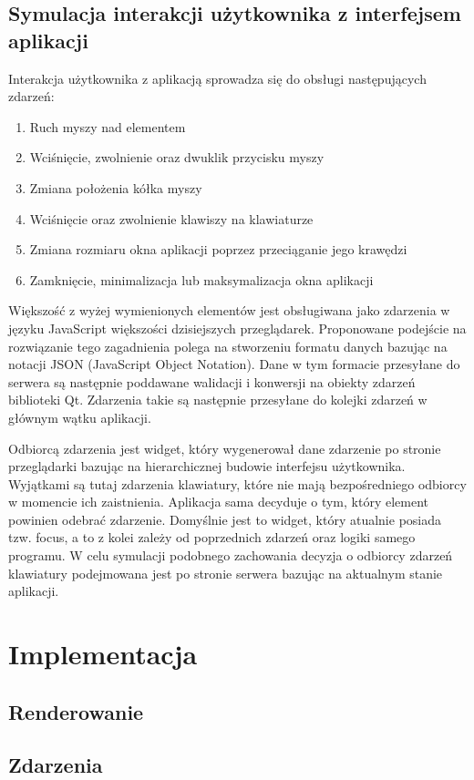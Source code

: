 \documentclass[polish]{inz}
\begin{document}
\section{Symulacja interakcji użytkownika z interfejsem aplikacji}
Interakcja użytkownika z aplikacją sprowadza się do obsługi następujących zdarzeń:
\begin{enumerate}
  \item Ruch myszy nad elementem
  \item Wciśnięcie, zwolnienie oraz dwuklik przycisku myszy
  \item Zmiana położenia kółka myszy
  \item Wciśnięcie oraz zwolnienie klawiszy na klawiaturze
  \item Zmiana rozmiaru okna aplikacji poprzez przeciąganie jego krawędzi
  \item Zamknięcie, minimalizacja lub maksymalizacja okna aplikacji
\end{enumerate}
Większość z wyżej wymienionych elementów jest obsługiwana jako zdarzenia w języku JavaScript większości dzisiejszych przeglądarek. Proponowane podejście na rozwiązanie tego zagadnienia polega na stworzeniu formatu danych bazując na notacji JSON (JavaScript Object Notation). Dane w tym formacie przesyłane do serwera są następnie poddawane walidacji i konwersji na obiekty zdarzeń biblioteki Qt. Zdarzenia takie są następnie przesyłane do kolejki zdarzeń w głównym wątku aplikacji. 

Odbiorcą zdarzenia jest widget, który wygenerował dane zdarzenie po stronie przeglądarki bazując na hierarchicznej budowie interfejsu użytkownika. Wyjątkami są tutaj zdarzenia klawiatury, które nie mają bezpośredniego odbiorcy w momencie ich zaistnienia. Aplikacja sama decyduje o tym, który element powinien odebrać zdarzenie. Domyślnie jest to widget, który atualnie posiada tzw. focus, a to z kolei zależy od poprzednich zdarzeń oraz logiki samego programu. W celu symulacji podobnego zachowania decyzja o odbiorcy zdarzeń klawiatury podejmowana jest po stronie serwera bazując na aktualnym stanie aplikacji.

\chapter{Implementacja}
\section{Renderowanie}

\section{Zdarzenia}

\end{document}
